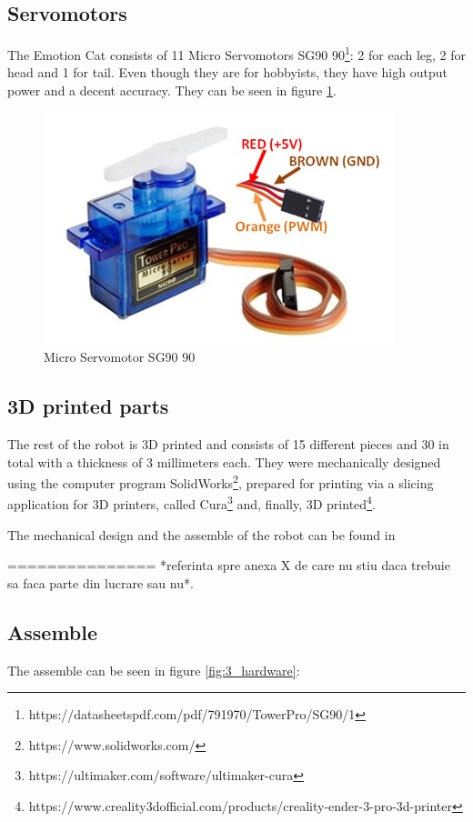 \documentclass[runningheads,a4paper,12pt]{report}
\begin{document}
\subsection*{Servomotors}
The Emotion Cat consists of 11 Micro Servomotors SG90 90\textdegree\footnote{https://datasheetspdf.com/pdf/791970/TowerPro/SG90/1}: 2 for each leg, 2 for head and 1 for tail. Even though they are for hobbyists, they have high output power and a decent accuracy. They can be seen in figure \ref{fig:servo}.

\begin{figure}
	\centering

  	\includegraphics[width=.6\linewidth]{./images/3_servo}\hfill

    \caption{Micro Servomotor SG90 90\textdegree}  
    \label{fig:servo}
\end{figure}

\subsection*{3D printed parts}
The rest of the robot is 3D printed and consists of 15 different pieces and 30 in total with a thickness of 3 millimeters each. They were mechanically designed using the computer program SolidWorks\footnote{https://www.solidworks.com/}, prepared for printing via a slicing application for 3D printers, called Cura\footnote{https://ultimaker.com/software/ultimaker-cura} and, finally, 3D printed\footnote{https://www.creality3dofficial.com/products/creality-ender-3-pro-3d-printer}.  

The mechanical design and the assemble of the robot can be found in 

=============== *referinta spre anexa X de care nu stiu daca trebuie sa faca parte din lucrare sau nu*.

\subsection{Assemble}
The assemble can be seen in figure \ref{fig:3_hardware}:
\end{document}
